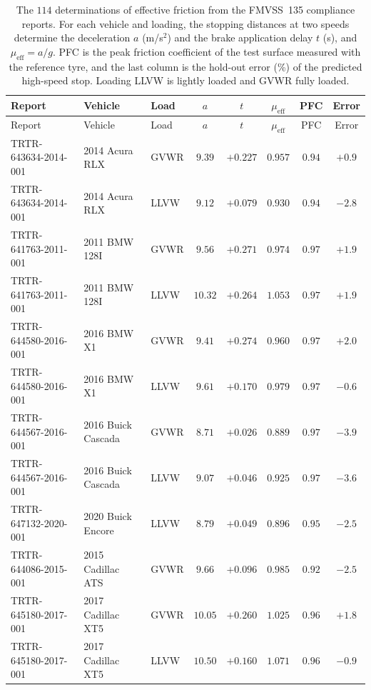 \documentclass[12pt, twoside]{amsart}
\theoremstyle{definition}
\begin{document}
{\footnotesize\setlength{\tabcolsep}{3pt}
\begin{longtable}{lp{2.9cm}lccccc}
\caption{The $114$ determinations of effective friction from the FMVSS~135 compliance reports. For each vehicle and loading, the stopping distances at two speeds determine the deceleration $a$ (m/s$^2$) and the brake application delay $t$ (s), and $\mu_{\mathrm{eff}}=a/g$. PFC is the peak friction coefficient of the test surface measured with the reference tyre, and the last column is the hold-out error (\%) of the predicted high-speed stop. Loading LLVW is lightly loaded and GVWR fully loaded.}\label{tab:fmvss}\\
\toprule
Report & Vehicle & Load & $a$ & $t$ & $\mu_{\mathrm{eff}}$ & PFC & Error\\
\midrule
\endfirsthead
\toprule
Report & Vehicle & Load & $a$ & $t$ & $\mu_{\mathrm{eff}}$ & PFC & Error\\
\midrule
\endhead
\bottomrule
\endfoot
TRTR-643634-2014-001 & 2014 Acura RLX & GVWR & $9.39$ & $+0.227$ & $0.957$ & $0.94$ & $+0.9$\\
TRTR-643634-2014-001 & 2014 Acura RLX & LLVW & $9.12$ & $+0.079$ & $0.930$ & $0.94$ & $-2.8$\\
TRTR-641763-2011-001 & 2011 BMW 128I & GVWR & $9.56$ & $+0.271$ & $0.974$ & $0.97$ & $+1.9$\\
TRTR-641763-2011-001 & 2011 BMW 128I & LLVW & $10.32$ & $+0.264$ & $1.053$ & $0.97$ & $+1.9$\\
TRTR-644580-2016-001 & 2016 BMW X1 & GVWR & $9.41$ & $+0.274$ & $0.960$ & $0.97$ & $+2.0$\\
TRTR-644580-2016-001 & 2016 BMW X1 & LLVW & $9.61$ & $+0.170$ & $0.979$ & $0.97$ & $-0.6$\\
TRTR-644567-2016-001 & 2016 Buick Cascada & GVWR & $8.71$ & $+0.026$ & $0.889$ & $0.97$ & $-3.9$\\
TRTR-644567-2016-001 & 2016 Buick Cascada & LLVW & $9.07$ & $+0.046$ & $0.925$ & $0.97$ & $-3.6$\\
TRTR-647132-2020-001 & 2020 Buick Encore & LLVW & $8.79$ & $+0.049$ & $0.896$ & $0.95$ & $-2.5$\\
TRTR-644086-2015-001 & 2015 Cadillac ATS & GVWR & $9.66$ & $+0.096$ & $0.985$ & $0.92$ & $-2.5$\\
TRTR-645180-2017-001 & 2017 Cadillac XT5 & GVWR & $10.05$ & $+0.260$ & $1.025$ & $0.96$ & $+1.8$\\
TRTR-645180-2017-001 & 2017 Cadillac XT5 & LLVW & $10.50$ & $+0.160$ & $1.071$ & $0.96$ & $-0.9$\\

\end{longtable}}
\end{document}
